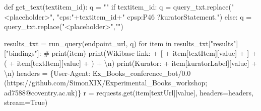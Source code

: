 \documentclass[
  letterpaper,
]{book}
\newenvironment{Shaded}{\begin{snugshade}}{\end{snugshade}}
\newcommand{\BuiltInTok}[1]{\textcolor[rgb]{0.00,0.23,0.31}{#1}}
\newcommand{\CharTok}[1]{\textcolor[rgb]{0.13,0.47,0.30}{#1}}
\newcommand{\CommentTok}[1]{\textcolor[rgb]{0.37,0.37,0.37}{#1}}
\newcommand{\ControlFlowTok}[1]{\textcolor[rgb]{0.00,0.23,0.31}{#1}}
\newcommand{\KeywordTok}[1]{\textcolor[rgb]{0.00,0.23,0.31}{#1}}
\newcommand{\NormalTok}[1]{\textcolor[rgb]{0.00,0.23,0.31}{#1}}
\newcommand{\OperatorTok}[1]{\textcolor[rgb]{0.37,0.37,0.37}{#1}}
\newcommand{\StringTok}[1]{\textcolor[rgb]{0.13,0.47,0.30}{#1}}
\newcommand{\VariableTok}[1]{\textcolor[rgb]{0.07,0.07,0.07}{#1}}
\begin{document}
\begin{Shaded}
\begin{Highlighting}[]
\KeywordTok{def}\NormalTok{ get\_text(textitem\_id):}
\NormalTok{    q }\OperatorTok{=} \StringTok{""}
    \ControlFlowTok{if}\NormalTok{ textitem\_id:}
\NormalTok{        q }\OperatorTok{=}\NormalTok{ query\_txt.replace(}\StringTok{"\textless{}placeholder\textgreater{}"}\NormalTok{, }\StringTok{"cps:"}\OperatorTok{+}\NormalTok{textitem\_id}\OperatorTok{+}\StringTok{" cpsp:P46 ?kuratorStatement."}\NormalTok{)}
    \ControlFlowTok{else}\NormalTok{:}
\NormalTok{        q }\OperatorTok{=}\NormalTok{ query\_txt.replace(}\StringTok{"\textless{}placeholder\textgreater{}"}\NormalTok{,}\StringTok{""}\NormalTok{)}

\NormalTok{    results\_txt }\OperatorTok{=}\NormalTok{ run\_query(endpoint\_url, q)}
    \ControlFlowTok{for}\NormalTok{ item }\KeywordTok{in}\NormalTok{ results\_txt[}\StringTok{"results"}\NormalTok{][}\StringTok{"bindings"}\NormalTok{]:}
        \CommentTok{\# print(item)}
        \BuiltInTok{print}\NormalTok{(}\StringTok{\textquotesingle{}Wikibase link: \textquotesingle{}} \OperatorTok{+} \StringTok{\textquotesingle{}[\textquotesingle{}} \OperatorTok{+}\NormalTok{ item[}\StringTok{\textquotesingle{}textItem\textquotesingle{}}\NormalTok{][}\StringTok{\textquotesingle{}value\textquotesingle{}}\NormalTok{] }\OperatorTok{+} \StringTok{\textquotesingle{}]\textquotesingle{}} \OperatorTok{+} \StringTok{\textquotesingle{}(\textquotesingle{}} \OperatorTok{+}\NormalTok{ item[}\StringTok{\textquotesingle{}textItem\textquotesingle{}}\NormalTok{][}\StringTok{\textquotesingle{}value\textquotesingle{}}\NormalTok{] }\OperatorTok{+} \StringTok{\textquotesingle{})\textquotesingle{}} \OperatorTok{+} \StringTok{\textquotesingle{}}\CharTok{\textbackslash{}n}\StringTok{\textquotesingle{}}\NormalTok{)}
        \BuiltInTok{print}\NormalTok{(}\StringTok{\textquotesingle{}Kurator: \textquotesingle{}} \OperatorTok{+}\NormalTok{ item[}\StringTok{\textquotesingle{}kuratorLabel\textquotesingle{}}\NormalTok{][}\StringTok{\textquotesingle{}value\textquotesingle{}}\NormalTok{] }\OperatorTok{+} \StringTok{\textquotesingle{}}\CharTok{\textbackslash{}n}\StringTok{\textquotesingle{}}\NormalTok{)}
\NormalTok{        headers }\OperatorTok{=}\NormalTok{ \{}\StringTok{\textquotesingle{}User{-}Agent\textquotesingle{}}\NormalTok{: }\StringTok{\textquotesingle{}Ex\_Books\_conference\_bot/0.0 (https://github.com/SimonXIX/Experimental\_Books\_workshop; ad7588@coventry.ac.uk)\textquotesingle{}}\NormalTok{\}}
\NormalTok{        r }\OperatorTok{=}\NormalTok{ requests.get(item[}\StringTok{\textquotesingle{}textUrl\textquotesingle{}}\NormalTok{][}\StringTok{\textquotesingle{}value\textquotesingle{}}\NormalTok{], headers}\OperatorTok{=}\NormalTok{headers, stream}\OperatorTok{=}\VariableTok{True}\NormalTok{)}

\end{Highlighting}
\end{Shaded}
\end{document}

